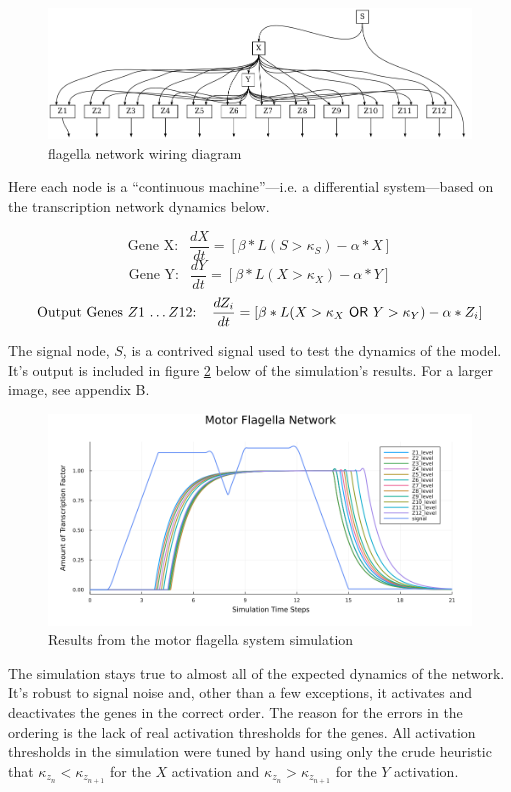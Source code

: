 \documentclass[12pt]{article}
\begin{document}
\begin{figure}[h]
    \centering
    \includegraphics*[scale=0.5]{motor_flagella_network.png}
    \caption{flagella network wiring diagram}
    \label{fig:flagella network}
\end{figure}


Here each node is a ``continuous machine''---i.e. a differential system---based on the transcription network dynamics below.

$$\text{Gene X: } \ \ \frac{dX}{dt} = [\beta*L(S > \kappa_S) - \alpha * X]$$
$$\text{Gene Y: } \ \ \frac{dY}{dt} = [\beta*L(X > \kappa_X) - \alpha * Y]$$
$$\text{Output Genes $Z1$ \dots $Z12$: } \ \ \frac{dZ_i}{dt} = [\beta*L(X > \kappa_X \ \mathsf{OR} \ Y > \kappa_Y) - \alpha * Z_i]$$

The signal node, $S$, is a contrived signal used to test the dynamics of the model.
It's output is included in figure \ref{fig:simulation_results} below of the simulation's results.
For a larger image, see appendix B.
\begin{figure}[h]
    \centering
    \includegraphics*[scale=0.6]{motor_flagella.png}
    \caption{Results from the motor flagella system simulation}
    \label{fig:simulation_results}
\end{figure}


The simulation stays true to almost all of the expected dynamics of the network.
It's robust to signal noise and, other than a few exceptions, it activates and deactivates the genes in the correct order.
The reason for the errors in the ordering is the lack of real activation thresholds for the genes.
All activation thresholds in the simulation were tuned by hand using only the crude heuristic that $\kappa_{z_n} < \kappa_{z_{n+1}}$ for the $X$ activation and $\kappa_{z_n} > \kappa_{z_{n+1}}$ for the $Y$ activation.
\end{document}
